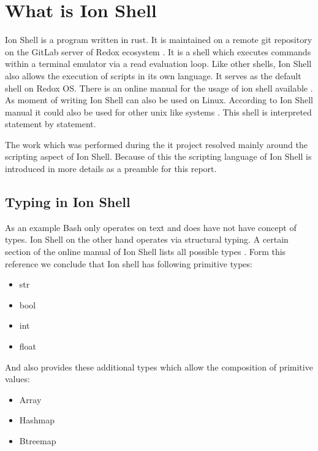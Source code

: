 \chapter{What is Ion Shell}\label{ch:intro}

Ion Shell is a program written in rust.
It is maintained on a remote git repository on the GitLab server of Redox ecosystem \cite{ion_shell}.
It is a shell which executes commands within a terminal emulator via a read evaluation loop.
Like other shells, Ion Shell also allows the execution of scripts in its own language.
It serves as the default shell on Redox OS.
There is an online manual for the usage of ion shell available \cite{ion_shell_online_manual}.
As moment of writing Ion Shell can also be used on Linux.
According to Ion Shell manual it could also be used for other unix like systems \cite{ion_shell_online_manual}.
This shell is interpreted statement by statement.

The work which was performed during the it project resolved mainly around the scripting aspect of Ion Shell.
Because of this the scripting language of Ion Shell is introduced in more details as a preamble for this report.

\section{Typing in Ion Shell}

As an example Bash only operates on text and does have not have concept of types.
Ion Shell on the other hand operates via structural typing.
A certain section of the online manual of Ion Shell lists all possible types \cite{ion_shell_types}.
Form this reference we conclude that Ion shell has following primitive types:

\begin{itemize}
	\item str
	\item bool
	\item int
	\item float
\end{itemize}

And also provides these additional types which allow the composition of primitive values:

\begin{itemize}
	\item Array
	\item Hashmap
	\item Btreemap
\end{itemize}

